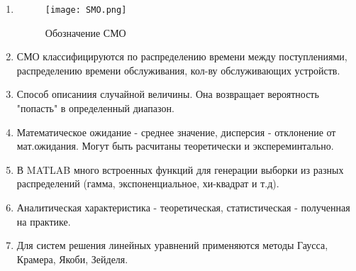 \begin{enumerate}

    \item 
        \begin{figure}[H]
        \centering
        \texttt{[image: SMO.png]}
        \caption{Обозначение СМО}
        \end{figure}
    \item СМО классифицируются по распределению времени между поступлениями, распределению времени обслуживания, кол-ву обслуживающих устройств.
    \item Способ описаниия случайной величины. Она возвращает вероятность "попасть" в определенный диапазон.
    \item Математическое ожидание - среднее значение, дисперсия - отклонение от мат.ожидания. Могут быть расчитаны теоретически и экспереминтально.
    \item В MATLAB много встроенных функций для генерации выборки из разных распределений (гамма, экспоненциальное, хи-квадрат и т.д).
    \item Аналитическая характеристика - теоретическая, статистическая - полученная на практике.
    \item Для систем решения линейных уравнений применяются методы Гаусса, Крамера, Якоби, Зейделя.
\end{enumerate}

\endinput
